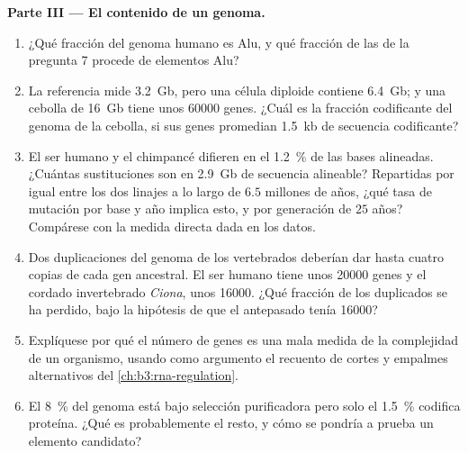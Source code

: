 \begin{problem}
\medskip
\noindent\textbf{Parte III --- El contenido de un genoma.}
\begin{enumerate}[resume]
  \item ¿Qué fracción del genoma humano es Alu, y qué fracción de las
         de la pregunta 7 procede de elementos Alu?
  \item La referencia mide \qty{3.2}{Gb}, pero una célula diploide
        contiene \qty{6.4}{Gb}; y una cebolla de \qty{16}{Gb} tiene unos
        \num{60000} genes. ¿Cuál es la fracción codificante del genoma
        de la cebolla, si sus genes promedian \qty{1.5}{kb} de secuencia
        codificante?
  \item El ser humano y el chimpancé difieren en el \qty{1.2}{\%} de
        las bases alineadas. ¿Cuántas sustituciones son en \qty{2.9}{Gb}
        de secuencia alineable? Repartidas por igual entre los dos
        linajes a lo largo de $6.5$ millones de años, ¿qué tasa de
        mutación por base y año implica esto, y por generación de $25$
        años? Compárese con la medida directa dada en los datos.
  \item Dos duplicaciones del genoma de los vertebrados deberían dar
        hasta cuatro copias de cada gen ancestral. El ser humano tiene
        unos \num{20000} genes y el cordado invertebrado \emph{Ciona},
        unos \num{16000}. ¿Qué fracción de los duplicados se ha
        perdido, bajo la hipótesis de que el antepasado tenía
        \num{16000}?
  \item Explíquese por qué el número de genes es una mala medida de la
        complejidad de un organismo, usando como argumento el recuento
        de cortes y empalmes alternativos del
        \cref{ch:b3:rna-regulation}.
  \item El \qty{8}{\%} del genoma está bajo selección purificadora pero
        solo el \qty{1.5}{\%} codifica proteína. ¿Qué es probablemente
        el resto, y cómo se pondría a prueba un elemento candidato?
\end{enumerate}


\end{problem}

